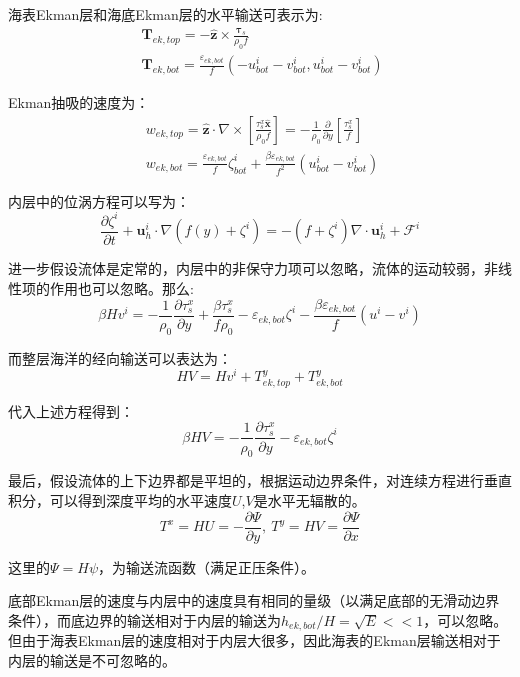 \documentclass{article}
\begin{document}
海表Ekman层和海底Ekman层的水平输送可表示为:
\begin{align}
  & {{\mathbf{T}}_{ek,top}}=-\mathbf{\hat{z}}\times \frac{{{\mathbf{\tau }}_{s}}}{{{\rho }_{0}}f} \\ 
 & {{\mathbf{T}}_{ek,bot}}=\frac{{{\varepsilon }_{ek,bot}}}{f}(-u_{bot}^{i}-v_{bot}^{i},u_{bot}^{i}-v_{bot}^{i})\ \  
\end{align}

Ekman抽吸的速度为：
\begin{align}
  & {{w}_{ek,top}}=\mathbf{\hat{z}}\cdot \nabla \times \left[ \frac{\tau _{s}^{x}\mathbf{\hat{x}}}{{{\rho }_{0}}f} \right]=-\frac{1}{{{\rho }_{0}}}\frac{\partial }{\partial y}\left[ \frac{\tau _{s}^{x}}{f} \right] \\ 
 & {{w}_{ek,bot}}=\frac{{{\varepsilon }_{ek,bot}}}{f}\zeta _{bot}^{i}+\frac{\beta {{\varepsilon }_{ek,bot}}}{{{f}^{2}}}\left( u_{bot}^{i}-v_{bot}^{i} \right)\ \  
\end{align}

内层中的位涡方程可以写为：
$$\frac{\partial {{\zeta }^{i}}}{\partial t}+\mathbf{u}_{h}^{i}\cdot \nabla \left( f(y)+{{\zeta }^{i}} \right)=-\left( f+{{\zeta }^{i}} \right)\nabla \cdot \mathbf{u}_{h}^{i}+{{\mathcal{F}}^{i}}$$

进一步假设流体是定常的，内层中的非保守力项可以忽略，流体的运动较弱，非线性项的作用也可以忽略。那么:
$$\beta H{{v}^{i}}=-\frac{1}{{{\rho }_{0}}}\frac{\partial \tau _{s}^{x}}{\partial y}+\frac{\beta \tau _{s}^{x}}{f{{\rho }_{0}}}-{{\varepsilon }_{ek,bot}}{{\zeta }^{i}}-\frac{\beta {{\varepsilon }_{ek,bot}}}{f}({{u}^{i}}-{{v}^{i}})$$

而整层海洋的经向输送可以表达为：
$$HV=H{{v}^{i}}+T_{ek,top}^{y}+T_{ek,bot}^{y}$$

代入上述方程得到：
$$\beta HV=-\frac{1}{{{\rho }_{0}}}\frac{\partial \tau _{s}^{x}}{\partial y}-{{\varepsilon }_{ek,bot}}{{\zeta }^{i}}$$

最后，假设流体的上下边界都是平坦的，根据运动边界条件，对连续方程进行垂直积分，可以得到深度平均的水平速度$U$,$V$是水平无辐散的。
$${{T}^{x}}=HU=-\frac{\partial \Psi }{\partial y},\ {{T}^{y}}=HV=\frac{\partial \Psi }{\partial x}$$

这里的$\Psi = H\psi$，为输送流函数（满足正压条件）。

底部Ekman层的速度与内层中的速度具有相同的量级（以满足底部的无滑动边界条件），而底边界的输送相对于内层的输送为$h_{ek,bot}/H=\sqrt{E}<<1$，可以忽略。但由于海表Ekman层的速度相对于内层大很多，因此海表的Ekman层输送相对于内层的输送是不可忽略的。
\end{document}
